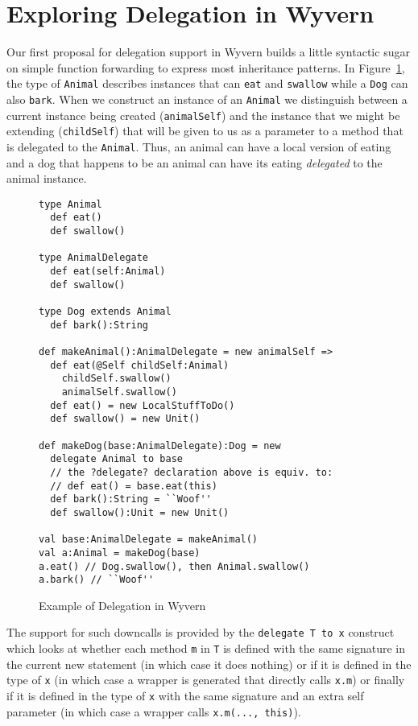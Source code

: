 \documentclass[preprint,10pt]{sigplanconf}
\begin{document}
\section{Exploring Delegation in Wyvern}

Our first proposal for delegation support in Wyvern builds a little syntactic sugar on simple function forwarding to express most inheritance patterns.  In Figure~\ref{f:wyvern-delegation}, the type of \texttt{Animal} describes instances that can \texttt{eat} and \texttt{swallow} while a \texttt{Dog} can also \texttt{bark}. When we construct an instance of an \texttt{Animal} we distinguish between a current instance being created (\texttt{animalSelf}) and the instance that we might be extending (\texttt{childSelf}) that will be given to us as a parameter to a method that is delegated to the \texttt{Animal}. Thus, an animal can have a local version of eating and a dog that happens to be an animal can have its eating \textit{delegated} to the animal instance.

\begin{figure}
\begin{lstlisting}
type Animal
  def eat()
  def swallow()

type AnimalDelegate
  def eat(self:Animal)
  def swallow()

type Dog extends Animal
  def bark():String

def makeAnimal():AnimalDelegate = new animalSelf =>
  def eat(@Self childSelf:Animal)
    childSelf.swallow()
    animalSelf.swallow()
  def eat() = new LocalStuffToDo()
  def swallow() = new Unit()

def makeDog(base:AnimalDelegate):Dog = new
  delegate Animal to base
  // the ?delegate? declaration above is equiv. to:
  // def eat() = base.eat(this)
  def bark():String = ``Woof''
  def swallow():Unit = new Unit()

val base:AnimalDelegate = makeAnimal()
val a:Animal = makeDog(base)
a.eat() // Dog.swallow(), then Animal.swallow()
a.bark() // ``Woof''
\end{lstlisting}
\vspace{-5mm} %
\caption{Example of Delegation in Wyvern}
\vspace{-5mm} %
\label{f:wyvern-delegation}
\end{figure}

The support for such downcalls is provided by the \texttt{delegate T to x} construct which looks at whether each method \texttt{m} in \texttt{T} is defined with the same signature in the current new statement (in which case it does nothing) or if it is defined in the type of \texttt{x} (in which case a wrapper is generated that directly calls \texttt{x.m}) or finally if it is defined in the type of \texttt{x} with the same signature and an extra self parameter (in which case a wrapper calls \texttt{x.m(..., this)}).
\end{document}
